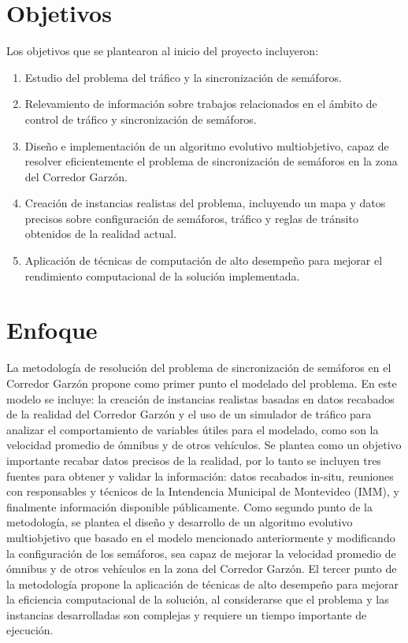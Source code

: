 \section{Objetivos}

Los objetivos que se plantearon al inicio del proyecto incluyeron:

\begin{enumerate}
	\item Estudio del problema del tráfico y la sincronización de semáforos.
	\item Relevamiento de información sobre trabajos relacionados en el ámbito de control de tráfico y sincronización de semáforos.
	\item Diseño e implementación de un algoritmo evolutivo multiobjetivo, capaz de resolver eficientemente el problema de sincronización de semáforos en la zona del Corredor Garzón.
	\item Creación de instancias realistas del problema, incluyendo un mapa y datos precisos sobre configuración de semáforos, tráfico y reglas de tránsito obtenidos de la realidad actual.	
	\item Aplicación de técnicas de computación de alto desempeño para mejorar el rendimiento computacional de la solución implementada.

\end{enumerate}

 
\section{Enfoque}

La metodología de resolución del problema de sincronización de semáforos en el Corredor Garzón propone como primer punto el modelado del problema. En este modelo se incluye: la creación de instancias realistas basadas en datos recabados de la realidad del Corredor Garzón y el uso de un simulador de tráfico para analizar el comportamiento de variables útiles para el modelado, como son la velocidad promedio de ómnibus y de otros vehículos. Se plantea como un objetivo importante recabar datos precisos de la realidad, por lo tanto se incluyen tres fuentes para obtener y validar la información: datos recabados in-situ, reuniones con responsables y técnicos de la Intendencia Municipal de Montevideo (IMM), y finalmente información disponible públicamente.
Como segundo punto de la metodología, se plantea el diseño y desarrollo de un algoritmo evolutivo multiobjetivo que basado en el modelo mencionado anteriormente y modificando la configuración de los semáforos, sea capaz de mejorar la velocidad promedio de ómnibus y de otros vehículos en la zona del Corredor Garzón. 
El tercer punto de la metodología propone la aplicación de técnicas de alto desempeño para mejorar la eficiencia computacional de la solución, al considerarse que el problema y las instancias desarrolladas son complejas y requiere un tiempo importante de ejecución.



